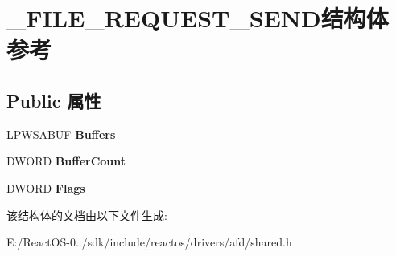 \hypertarget{struct___f_i_l_e___r_e_q_u_e_s_t___s_e_n_d}{}\section{\+\_\+\+F\+I\+L\+E\+\_\+\+R\+E\+Q\+U\+E\+S\+T\+\_\+\+S\+E\+N\+D结构体 参考}
\label{struct___f_i_l_e___r_e_q_u_e_s_t___s_e_n_d}
\subsection*{Public 属性}
\begin{DoxyCompactItemize}
\item 
\mbox{\label{struct___f_i_l_e___r_e_q_u_e_s_t___s_e_n_d_a9527c27bbbfff42307aacd08cf296b5f}} 
\hyperlink{struct___w_s_a_b_u_f}{L\+P\+W\+S\+A\+B\+UF} {\bfseries Buffers}
\item 
\mbox{\label{struct___f_i_l_e___r_e_q_u_e_s_t___s_e_n_d_aa6d7cfd98841ddbe25ef993dcdc5d76a}} 
D\+W\+O\+RD {\bfseries Buffer\+Count}
\item 
\mbox{\label{struct___f_i_l_e___r_e_q_u_e_s_t___s_e_n_d_ab7c42c69a0587aca5fd044a5271725e5}} 
D\+W\+O\+RD {\bfseries Flags}
\end{DoxyCompactItemize}


该结构体的文档由以下文件生成\+:\begin{DoxyCompactItemize}
\item 
E\+:/\+React\+O\+S-\/0../sdk/include/reactos/drivers/afd/shared.\+h\end{DoxyCompactItemize}

